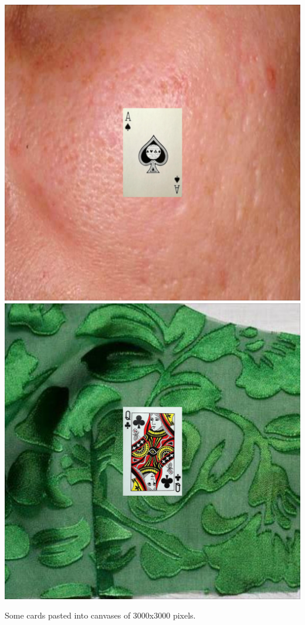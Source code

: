 \documentclass[a4paper]{article}
\begin{document}
\begin{minipage}{\columnwidth}
{\includegraphics[scale=0.04]{images/as_1}  \quad
\includegraphics[scale=0.04]{images/qc_1} }
\caption{Some cards pasted into canvases of 3000x3000 pixels.}
\label{fig-canvas}
\end{minipage}
\end{document}
